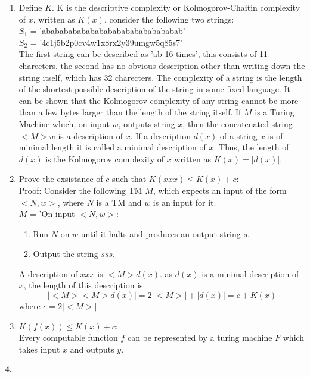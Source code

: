 \documentclass[a4paper,12pt]{article}
\begin{document}
\begin{enumerate}[label=\alph*)]
\item Define $K$. K is the descriptive complexity or Kolmogorov-Chaitin complexity of $x$, written as $K(x)$. consider the following two strings: \\
$S_1$ = 'abababababababababababababababab'\\
$S_2$ = '4c1j5b2p0cv4w1x8rx2y39umgw5q85s7'\\
The first string can be described as 'ab 16 times', this consists of 11 charecters. the second has no obvious description other than writing down the string itself, which has 32 charecters. The complexity of a string is the length of the shortest possible description of the string in some fixed language. It can be shown that the Kolmogorov complexity of any string cannot be more than a few bytes larger than the length of the string itself. If $M$ is a Turing Machine which, on input $w$, outputs string $x$, then the concatenated string $<M> w$ is a description of $x$. If a description $d(x)$ of a string $x$ is of minimal length it is called a minimal description of $x$. Thus, the length of $d(x)$ is the Kolmogorov complexity of $x$ written as $K(x) = |d(x)|$.
\item Prove the exsistance of $c$ such that $K(xxx) \leq K(x)+c$: \\
Proof: Consider the following TM $M$, which expects an input of the form $<N, w>$, where $N$ is a TM and $w$ is an input for it. \\
$M$ = 'On input $<N, w>$:
\begin{enumerate}[label=\arabic*)]
\item Run $N$ on $w$ until it halts and produces an output string $s$.
\item Output the string $sss$.
\end{enumerate}
A description of $xxx$ is $<M>d(x)$. as $d(x)$ is a minimal description of $x$, the length of this description is:
$$|<M><M>d(x)| = 2|<M>| + |d(x)| = c + K(x)$$
where $c=2|<M>|$
\item $K(f(x)) \leq K(x) + c$: \\
Every computable function $f$ can be represented by a turing machine $F$ which takes input $x$ and outputs $y$. 
\end{enumerate}
\noindent \textbf{4.}
\end{document}

